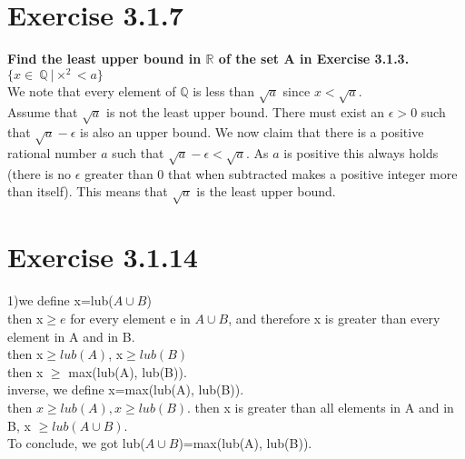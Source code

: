 \documentclass[12pt]{article}
\providecommand{\x}{\times}
\theoremstyle{definition}
\numberwithin{equation}{subsection}
\begin{document}
\section{Exercise 3.1.7}
\textbf{Find the least upper bound in $\mathbb R$ of the set A in Exercise 3.1.3.}
\\
$\{x \in\ \mathbb Q\ |\x^2 < a\}$
\\
We note that every element of $\mathbb{Q}$ is less than $\sqrt{a}$ since $x < \sqrt{a}$.
\\
Assume that $\sqrt{a}$ is not the least upper bound. There must exist an $\epsilon > 0$ such that $\sqrt{a} - \epsilon$ is also an upper bound. We now claim that there is a positive rational number $a$ such that $\sqrt{a} - \epsilon < \sqrt{a}$. As $a$ is positive this always holds (there is no $\epsilon$ greater than 0 that when subtracted makes a positive integer more than itself). This means that $\sqrt{a}$ is the least upper bound. 
\section{Exercise 3.1.14}
  1)we define x=lub($A\cup B$)
\\then x$\geq e$ for every element e in $A\cup B$, and therefore x is greater than every element in A and in B. 
\\then x$\geq lub(A)$, x$\geq lub(B)$
\\then x $\geq$ max(lub(A), lub(B)).
\\inverse, we define x=max(lub(A), lub(B)).
\\then $x\geq lub(A), x\geq lub(B) $. then x is greater than all elements in A and in B, x $\geq lub(A\cup B)$.
\\To conclude, we got lub($A\cup B$)=max(lub(A), lub(B)). 
\end{document}
